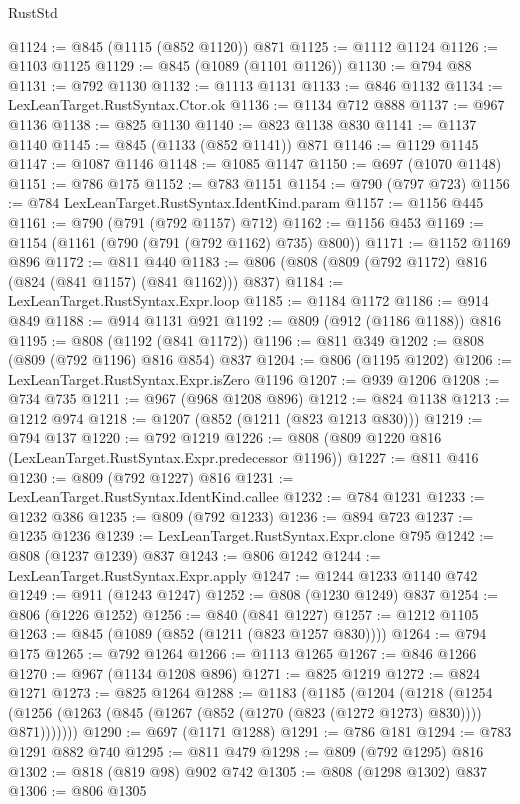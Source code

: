 \begin{lexlean}{RustStd}
\begin{coremodule}
@1124 := @845 (@1115 (@852 @1120)) @871
@1125 := @1112 @1124
@1126 := @1103 @1125
@1129 := @845 (@1089 (@1101 @1126))
@1130 := @794 @88
@1131 := @792 @1130
@1132 := @1113 @1131
@1133 := @846 @1132
@1134 := LexLeanTarget.RustSyntax.Ctor.ok
@1136 := @1134 @712 @888
@1137 := @967 @1136
@1138 := @825 @1130
@1140 := @823 @1138 @830
@1141 := @1137 @1140
@1145 := @845 (@1133 (@852 @1141)) @871
@1146 := @1129 @1145
@1147 := @1087 @1146
@1148 := @1085 @1147
@1150 := @697 (@1070 @1148)
@1151 := @786 @175
@1152 := @783 @1151
@1154 := @790 (@797 @723)
@1156 := @784 LexLeanTarget.RustSyntax.IdentKind.param
@1157 := @1156 @445
@1161 := @790 (@791 (@792 @1157) @712)
@1162 := @1156 @453
@1169 := @1154 (@1161 (@790 (@791 (@792 @1162) @735) @800))
@1171 := @1152 @1169 @896
@1172 := @811 @440
@1183 := @806 (@808 (@809 (@792 @1172) @816 (@824 (@841 @1157) (@841 @1162))) @837)
@1184 := LexLeanTarget.RustSyntax.Expr.loop
@1185 := @1184 @1172
@1186 := @914 @849
@1188 := @914 @1131 @921
@1192 := @809 (@912 (@1186 @1188)) @816
@1195 := @808 (@1192 (@841 @1172))
@1196 := @811 @349
@1202 := @808 (@809 (@792 @1196) @816 @854) @837
@1204 := @806 (@1195 @1202)
@1206 := LexLeanTarget.RustSyntax.Expr.isZero @1196
@1207 := @939 @1206
@1208 := @734 @735
@1211 := @967 (@968 @1208 @896)
@1212 := @824 @1138
@1213 := @1212 @974
@1218 := @1207 (@852 (@1211 (@823 @1213 @830)))
@1219 := @794 @137
@1220 := @792 @1219
@1226 := @808 (@809 @1220 @816 (LexLeanTarget.RustSyntax.Expr.predecessor @1196))
@1227 := @811 @416
@1230 := @809 (@792 @1227) @816
@1231 := LexLeanTarget.RustSyntax.IdentKind.callee
@1232 := @784 @1231
@1233 := @1232 @386
@1235 := @809 (@792 @1233)
@1236 := @894 @723
@1237 := @1235 @1236
@1239 := LexLeanTarget.RustSyntax.Expr.clone @795
@1242 := @808 (@1237 @1239) @837
@1243 := @806 @1242
@1244 := LexLeanTarget.RustSyntax.Expr.apply
@1247 := @1244 @1233 @1140 @742
@1249 := @911 (@1243 @1247)
@1252 := @808 (@1230 @1249) @837
@1254 := @806 (@1226 @1252)
@1256 := @840 (@841 @1227)
@1257 := @1212 @1105
@1263 := @845 (@1089 (@852 (@1211 (@823 @1257 @830))))
@1264 := @794 @175
@1265 := @792 @1264
@1266 := @1113 @1265
@1267 := @846 @1266
@1270 := @967 (@1134 @1208 @896)
@1271 := @825 @1219
@1272 := @824 @1271
@1273 := @825 @1264
@1288 := @1183
    (@1185
      (@1204
        (@1218
          (@1254 (@1256 (@1263 (@845 (@1267 (@852 (@1270 (@823 (@1272 @1273) @830)))) @871)))))))
@1290 := @697 (@1171 @1288)
@1291 := @786 @181
@1294 := @783 @1291 @882 @740
@1295 := @811 @479
@1298 := @809 (@792 @1295) @816
@1302 := @818 (@819 @98) @902 @742
@1305 := @808 (@1298 @1302) @837
@1306 := @806 @1305

\end{coremodule}
\end{lexlean}
